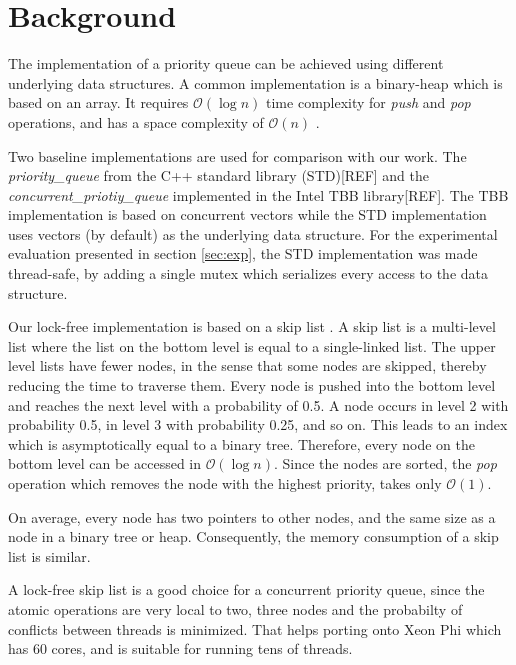 \section{Background}
\label{sec:background}

The implementation of a priority queue can be achieved using different underlying data structures.
A common implementation is a binary-heap which is based on an array. It requires $\mathcal{O}(\log{}n)$ time complexity for \textit{push} and \textit{pop} operations, and has a space complexity of $\mathcal{O}(n)$ .

Two baseline implementations are used for comparison with our work.
The \textit{priority\_queue} from the C++ standard library (STD)[REF] and the \textit{concurrent\_priotiy\_queue} implemented in the Intel TBB library[REF].
The TBB implementation is based on concurrent vectors while the STD implementation uses vectors (by default) as the underlying data structure.
For the experimental evaluation presented in section \ref{sec:exp}, the STD implementation was made thread-safe, by adding a single mutex which serializes every access to the data structure.

Our lock-free implementation is based on a skip list \cite{Pugh:1990:SLP:78973.78977}.
A skip list is a multi-level list where the list on the bottom level is equal to a single-linked list.
The upper level lists have fewer nodes, in the sense that some nodes are skipped, thereby reducing the time to traverse them.
Every node is pushed into the bottom level and reaches the next level with a probability of 0.5.
A node occurs in level 2 with probability 0.5, in level 3 with probability 0.25, and so on.
This leads to an index which is asymptotically equal to a binary tree.
Therefore, every node on the bottom level can be accessed in $\mathcal{O}(\log{}n)$.
Since the nodes are sorted, the \textit{pop} operation which removes the node with the highest priority, takes only $\mathcal{O}(1)$.

On average, every node has two pointers to other nodes, and the same size as a node in a binary tree or heap.
Consequently, the memory consumption of a skip list is similar.

A lock-free skip list is a good choice for a concurrent priority queue, since the atomic operations are very local to two, three nodes and the probabilty of conflicts between threads is minimized.
That helps porting onto Xeon Phi which has 60 cores, and is suitable for running tens of threads.

